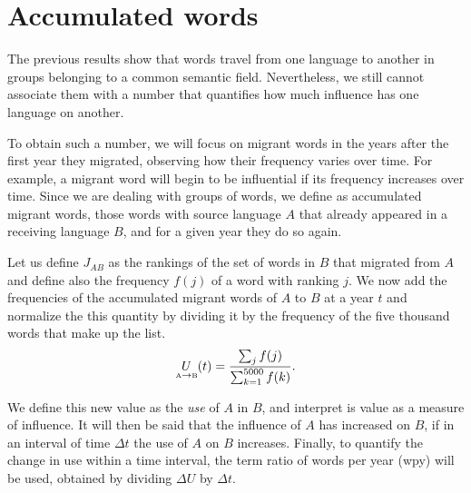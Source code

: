 \documentclass[10pt,letterpaper]{article} %
\begin{document}
\section*{Accumulated words} %

The previous results show that words travel from one language to another in
groups belonging to a common semantic field. Nevertheless, we still cannot
associate them with a number that quantifies how much influence has one
language on another.

To obtain such a number, we will focus on migrant words in the years after the
first year they migrated, observing how their frequency varies over time. For
example, a migrant word will begin to be influential if its frequency increases
over time. Since we are dealing with groups of words, we define as accumulated
migrant words, those words with source language $A$ that already appeared in a
receiving language $B$, and for a given year they do so again.

Let us define $J_{AB}$ as the rankings of the set of words in $B$ that migrated
from $A$ and define also the frequency $f(j)$ of a word with ranking $j$. We now
add the frequencies of the accumulated
migrant words of $A$ to $B$ at a year $t$ and normalize the this quantity by
dividing it by the frequency of the five thousand words that make up the list.
\begin{equation}
\label{ec.fuso}
\underset{ \text{\tiny A} \to  \text{\tiny B} }{U}(t) = \frac{\sum_{j}
f(j)}{\sum_{k=1}^{5000} f(k)}.
\end{equation}



% 
We define this new value as the \textit{use} of $A$ in $B$, and interpret is value
as a measure of influence. It will then be said that the influence of $A$ has increased on
$B$, if in an interval of time $\Delta t$ the use of $A$ on $B$ increases.
Finally, to quantify the change in use within a time interval, the term ratio
of words per year (wpy) will be used, obtained by dividing $\Delta U$  by
$\Delta t$.
\end{document}
